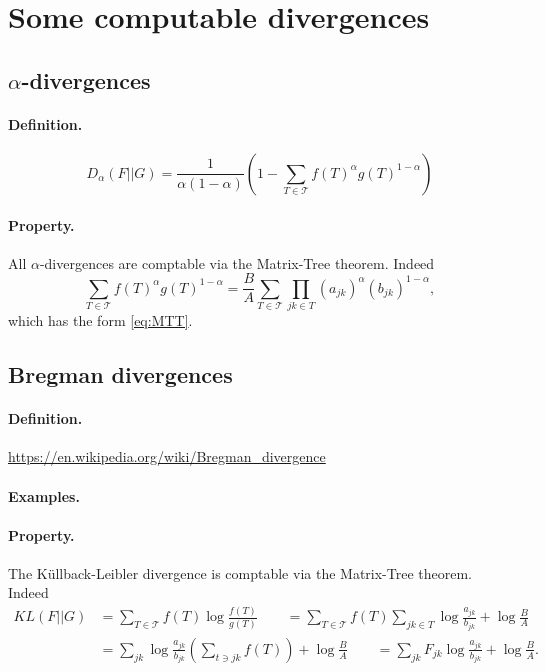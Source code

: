 \documentclass[a4paper, 10pt]{article}
\newcommand{\Tcal}{\mathcal{T}}
\begin{document}
\section{Some computable divergences} 

\subsection{$\alpha$-divergences} 

\paragraph{Definition.} \cite{Min05}
$$
D_\alpha(F || G) = \frac1{\alpha (1-\alpha)} \left(1 - \sum_{T \in \Tcal} f(T)^\alpha g(T)^{1 - \alpha} \right)
$$

\paragraph{Property.}  All $\alpha$-divergences are comptable via the Matrix-Tree theorem. Indeed
$$
\sum_{T \in \Tcal} f(T)^\alpha g(T)^{1 - \alpha} 
 = \frac{B}{A} \sum_{T \in \Tcal} \prod_{jk \in T} (a_{jk})^{\alpha} (b_{jk})^{1 - \alpha},
$$
which has the form \eqref{eq:MTT}.

\subsection{Bregman divergences} 

\paragraph{Definition.} 
\url{https://en.wikipedia.org/wiki/Bregman_divergence}

\paragraph{Examples.} 

\paragraph{Property.}  The Küllback-Leibler divergence is comptable via the Matrix-Tree theorem. Indeed
\begin{align*}
 KL(F || G) 
 & = \sum_{T \in \Tcal} f(T) \log \frac{f(T)}{g(T)} 
 \qquad = \sum_{T \in \Tcal}  f(T) \sum_{jk \in T} \log \frac{a_{jk}}{b_{jk}} + \log \frac{B}{A} \\
 & = \sum_{jk} \log \frac{a_{jk}}{b_{jk}} \left(\sum_{t \ni jk} f(T) \right) 
 + \log \frac{B}{A} 
 \qquad = \sum_{jk} F_{jk} \log \frac{a_{jk}}{b_{jk}} + \log \frac{B}{A}.
\end{align*}
\end{document}
